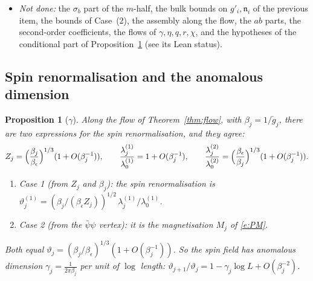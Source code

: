 \documentclass[11pt]{amsart}
\newtheorem{proposition}[theorem]{Proposition}
\theoremstyle{definition}
\theoremstyle{remark}
\numberwithin{equation}{section}
\begin{document}
\begin{itemize}
  exactly (\texttt{frakN2\_hist}). The bulk estimates of \texttt{Spin2.Case2Bulk} are proved under the master
  constants (\texttt{H02UV/Spin2/Case2/Case2Thm.lean}, \texttt{LoopConcl}). The observable remainders
  (\texttt{Case2Rel}) are bounded for every $\gamma_a$ (exact decoupling of the scale-$0$ constant, \texttt{RelConcl2G};
  for $\gamma_a=0$: \texttt{Spin2.thm\_multiscale\_case2D}: $\ell^1$ share
  machinery \texttt{H02UV/Obs2/Flow/BlockFlowE.lean}, \texttt{PtCorr2.obs\_hist\_rel2}, \texttt{PtCorr2.prodBd2\_hist},
  $|\mathrm{tadInc2}_{kj}|\le c(2/L)^{j-k}\check g_k$).
\item \emph{Not done:}
  the $\sigma_b$ part of the $m$-half, the bulk bounds on $g'_i,\mathfrak n_i$ of the previous item,
  the bounds of Case~(2), the assembly along the flow, the $ab$ parts, the second-order coefficients,
  the flows of $\gamma,\eta,q,r,\chi$, and the hypotheses of the conditional part of
  Proposition~\ref{prop:gamma} (see its Lean status).
\end{itemize}

\subsection{Spin renormalisation and the anomalous dimension}
\label{sec:spin}

\begin{proposition}[$\gamma$]\label{prop:gamma}
Along the flow of Theorem~\ref{thm:flow}, with $\beta_j=1/\check g_j$, there are two
expressions for the spin renormalisation, and they agree:
\[
  Z_j=\Bigl(\frac{\beta_j}{\beta_\epsilon}\Bigr)^{1/3}(1+O(\beta_j^{-1})),\qquad
  \frac{\lambda^{(1)}_j}{\lambda^{(1)}_0}=1+O(\beta_j^{-1}),\qquad
  \frac{\lambda^{(2)}_j}{\lambda^{(2)}_0}=\Bigl(\frac{\beta_\epsilon}{\beta_j}\Bigr)^{1/3}(1+O(\beta_j^{-1})).
\]
\begin{enumerate}[label=(\roman*)]
\item \emph{Case 1 (from $Z_j$ and $\beta_j$):} the spin renormalisation is
  $\vartheta^{(1)}_j=(\beta_j/(\beta_\epsilon Z_j))^{1/2}\,\lambda^{(1)}_j/\lambda^{(1)}_0$.
\item \emph{Case 2 (from the $\bar\psi\psi$ vertex):} it is the magnetisation $M_j$ of
  \eqref{e:PM}.
\end{enumerate}
Both equal $\vartheta_j=(\beta_j/\beta_\epsilon)^{1/3}(1+O(\beta_j^{-1}))$. So the spin field has
anomalous dimension $\gamma_j=\frac1{2\pi\beta_j}$ per unit of $\log$ length:
$\vartheta_{j+1}/\vartheta_j=1-\gamma_j\log L+O(\beta_j^{-2})$.
\end{proposition}
\end{document}
